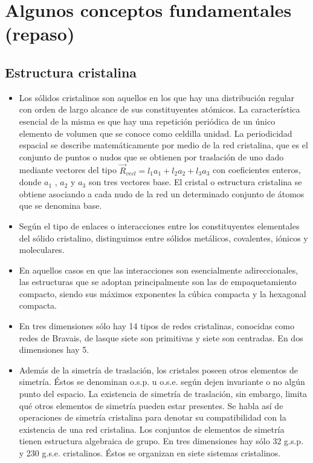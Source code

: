 \documentclass[11pt]{article}
\date{\today}
\title{}
\begin{document}
\tableofcontents

\section{Algunos conceptos fundamentales (repaso)}
\label{sec:orgd4beb07}
\subsection{Estructura cristalina}
\label{sec:orgf631ce1}
\begin{itemize}
\item Los sólidos cristalinos son aquellos en los que hay una distribución regular con orden de largo alcance de sus constituyentes atómicos. La característica esencial de la misma es que hay una repetición periódica de un único elemento de volumen que se conoce como celdilla unidad. La periodicidad espacial se describe matemáticamente por medio de la red cristalina, que es el conjunto de puntos o nudos que se obtienen por traslación de uno dado mediante vectores del tipo \(\vec R_{vec l} = l_1 a_1+ l_2 a_2+ l_3 a_3\) con coeficientes enteros, donde \(a_1\) , \(a_2\) y \(a_3\) son tres vectores base. El cristal o estructura cristalina se obtiene asociando a cada nudo de la red un determinado conjunto de átomos que se denomina base.

\item Según el tipo de enlaces o interacciones entre los constituyentes elementales del sólido cristalino, distinguimos entre sólidos metálicos, covalentes, iónicos y moleculares.

\item En aquellos casos en que las interacciones son esencialmente adireccionales, las estructuras que se adoptan principalmente son las de empaquetamiento compacto, siendo sus máximos exponentes la cúbica compacta y la hexagonal compacta.

\item En tres dimensiones sólo hay 14 tipos de redes cristalinas, conocidas como redes de Bravais, de lasque siete son primitivas y siete son centradas. En dos dimensiones hay 5.

\item Además de la simetría de traslación, los cristales poseen otros elementos de simetría. Éstos se denominan o.s.p. u o.s.e. según dejen invariante o no algún punto del espacio. La existencia de simetría de traslación, sin embargo, limita qué otros elementos de simetría pueden estar presentes. Se habla así de operaciones de simetría cristalina para denotar su compatibilidad con la existencia de una red cristalina. Los conjuntos de elementos de simetría tienen estructura algebraica de grupo. En tres dimensiones hay sólo 32 g.s.p. y 230 g.s.e. cristalinos. Éstos se organizan en siete sistemas cristalinos.


\end{itemize}
\end{document}
